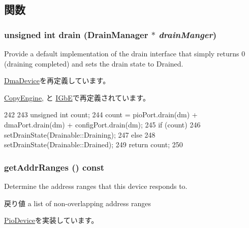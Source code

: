 \subsection{関数}
\hypertarget{classPciDevice_aa8a18d230dba7a674ac8a0b4f35bc36a}{
\subsubsection[{drain}]{\setlength{\rightskip}{0pt plus 5cm}unsigned int drain ({\bf DrainManager} $\ast$ {\em drainManger})}}
\label{classPciDevice_aa8a18d230dba7a674ac8a0b4f35bc36a}
Provide a default implementation of the drain interface that simply returns 0 (draining completed) and sets the drain state to Drained. 

\hyperlink{classDmaDevice_a6bf479c521c7c3eb473822d953275b26}{DmaDevice}を再定義しています。

\hyperlink{classCopyEngine_a6bf479c521c7c3eb473822d953275b26}{CopyEngine}, と \hyperlink{classIGbE_aa8a18d230dba7a674ac8a0b4f35bc36a}{IGbE}で再定義されています。


\begin{DoxyCode}
242 {
243     unsigned int count;
244     count = pioPort.drain(dm) + dmaPort.drain(dm) + configPort.drain(dm);
245     if (count)
246         setDrainState(Drainable::Draining);
247     else
248         setDrainState(Drainable::Drained);
249     return count;
250 }
\end{DoxyCode}
\hypertarget{classPciDevice_a36cf113d5e5e091ebddb32306c098fae}{
\subsubsection[{getAddrRanges}]{ getAddrRanges () const}}
\label{classPciDevice_a36cf113d5e5e091ebddb32306c098fae}
Determine the address ranges that this device responds to.

\begin{DoxyReturn}{戻り値}
a list of non-\/overlapping address ranges 
\end{DoxyReturn}


\hyperlink{classPioDevice_a6e967f8921e80748eb2be35b6b481a7e}{PioDevice}を実装しています。


